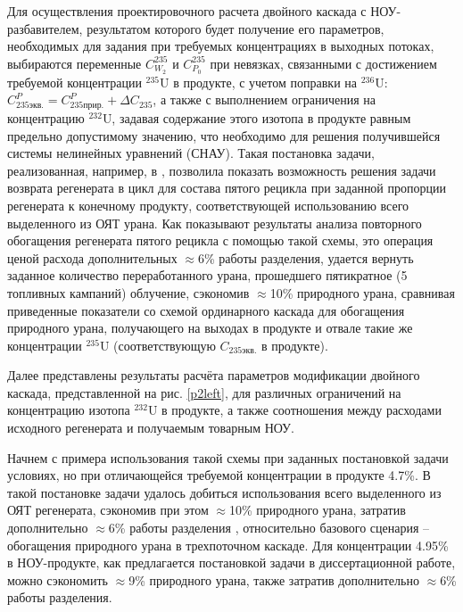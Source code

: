 Для осуществления проектировочного расчета двойного каскада с НОУ-разбавителем, результатом которого будет получение его параметров, необходимых для задания при требуемых концентрациях в выходных потоках, выбираются переменные $C_{W_2}^{235}$ и $C_{P_0}^{235}$ при невязках, связанными с достижением требуемой концентрации $^{235}$U в продукте, с учетом поправки на $^{236}$U: $C_{235 экв.}^{P}=C_{235 прир.}^{P}+\Delta C_{235}$, а также с выполнением ограничения на концентрацию $^{232}$U, задавая содержание этого изотопа в продукте равным предельно допустимому значению, что необходимо для решения получившейся системы нелинейных уравнений (СНАУ). Такая постановка задачи, реализованная, например, в \cite{gusevMultycascadeEnrichmentSchemes2020}, позволила показать возможность решения задачи возврата регенерата в цикл для состава пятого рецикла при заданной пропорции регенерата к конечному продукту, соответствующей использованию всего выделенного из ОЯТ урана. Как показывают результаты анализа повторного обогащения регенерата пятого рецикла с помощью такой схемы, это операция ценой расхода дополнительных $\approx$6\% работы разделения, удается вернуть заданное количество переработанного урана, прошедшего пятикратное (5 топливных кампаний) облучение, сэкономив $\approx$10\% природного урана, сравнивая приведенные показатели со схемой ординарного каскада для обогащения природного урана, получающего на выходах в продукте и отвале такие же концентрации $^{235}$U (соответствующую $C_{235 экв.}$ в продукте).

Далее представлены результаты расчёта параметров модификации двойного каскада, представленной на рис. \ref{p2left}, для различных ограничений на концентрацию изотопа $^{232}$U в продукте, а также соотношения между расходами исходного регенерата и получаемым товарным НОУ.

Начнем с примера использования такой схемы при заданных постановкой задачи условиях, но при отличающейся требуемой концентрации в продукте 4.7\%. В такой постановке задачи удалось добиться использования всего выделенного из ОЯТ регенерата, сэкономив при этом $\approx$10\% природного урана, затратив дополнительно $\approx$6\% работы разделения \cite{gusevMultycascadeEnrichmentSchemes2020}, относительно базового сценария -- обогащения природного урана в трехпоточном каскаде. Для концентрации 4.95\% в НОУ-продукте, как предлагается постановкой задачи в диссертационной работе, можно сэкономить  $\approx$9\% природного урана, также затратив дополнительно $\approx$6\% работы разделения.

